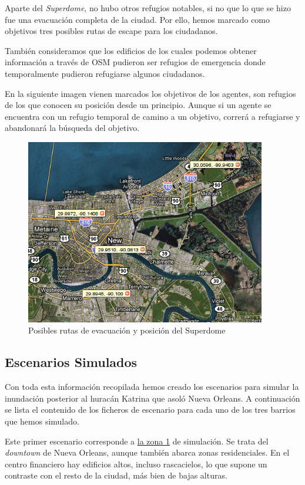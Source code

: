 Aparte del {\em Superdome}, no hubo otros refugios notables, si no que lo que se
hizo fue una evacuación completa de la ciudad. Por ello, hemos marcado como
objetivos tres posibles rutas de escape para los ciudadanos.

También consideramos que los edificios de los cuales podemos obtener
información a través de OSM pudieron ser refugios de emergencia donde
temporalmente pudieron refugiarse algunos ciudadanos.

En la siguiente imagen vienen marcados los objetivos de los agentes, son
refugios de los que conocen su posición desde un principio. Aunque si un agente
se encuentra con un refugio temporal de camino a un objetivo, correrá a
refugiarse y abandonará la búsqueda del objetivo.

\begin{figure}[H]
 \centering
 \includegraphics[width=105mm]{figuras/cap6/evacuation.png}
 \caption{Posibles rutas de evacuación y posición del Superdome}
 \label{objetivos}
\end{figure}

\subsection{Escenarios Simulados}

Con toda esta información recopilada hemos creado los escenarios para simular
la inundación posterior al huracán Katrina que asoló Nueva Orleans. A
continuación se lista el contenido de los ficheros de escenario para cada uno de
los tres barrios que hemos simulado.

Este primer escenario corresponde a \hyperref[zona1]{la zona 1} de simulación.
Se trata del {\em downtown} de Nueva Orleans, aunque también abarca zonas
residenciales. En el centro financiero hay edificios altos, incluso
rascacielos, lo que supone un contraste con el resto de la ciudad, más bien de
bajas alturas.

